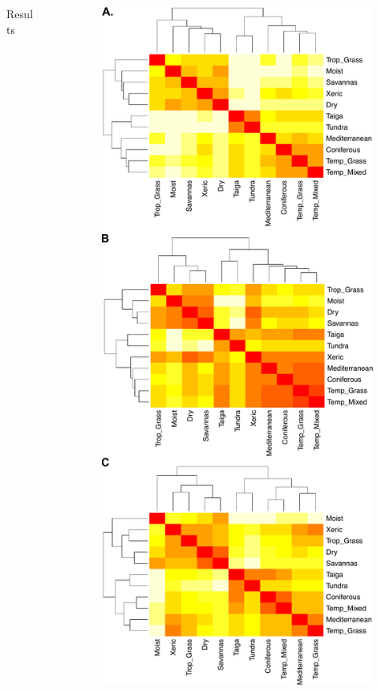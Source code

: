 \documentclass[final]{beamer}
\newlength{\sepwid}
\newlength{\onecolwid}
\newlength{\twocolwid}
\begin{document}
\begin{frame}[t]
\begin{columns}[t]
\begin{column}{\twocolwid}
\begin{block}{Results}
		 

		 \end{block}


 \end{column}



  \begin{column}{\sepwid}\end{column}			%
  \begin{column}{\onecolwid}



	\begin{figure}[h]
		\centering
		\includegraphics[scale=0.6]{./figures/Figure5.pdf}
		\caption{}
		\label{}
	\end{figure}





\end{column}
\end{columns}
\end{frame}
\end{document}
